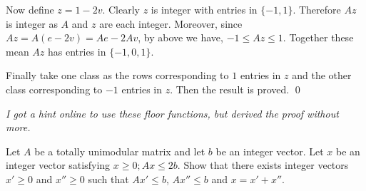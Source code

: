 \documentclass[10pt]{article}
\begin{document}
\begin{solution}
Now define \( z = 1-2v \). Clearly \( z \) is integer with entries in \( \{-1,1\} \). Therefore \( Az \) is integer as \( A \) and \( z \) are each integer. Moreover, since \( Az = A(e-2v) = Ae-2Av \), by above we have, \( -1\leq Az\leq 1 \). Together these mean \( Az \) has entries in \( \{-1,0,1\} \).

Finally take one class as the rows corresponding to \( 1 \) entries in \( z \) and the other class corresponding to \( -1 \) entries in \( z \). Then the result is proved. \qed

\textit{I got a hint online to use these floor functions, but derived the proof without more.}

\iffalse
Define a polyhedra,
\begin{align*}
    P = \left\{ x : \left[\begin{array}{r}A\\-A\\I\\-I\end{array}\right]x \leq \left[\begin{array}{r}1\\1\\1\\1\end{array}\right] \right\}
\end{align*}

Note that \( -1\leq x\leq 1 \) so that \( P \) is bounded. Moreover, and since \( 0\in P \), \( P \) is nonempty.

Therefore \( P \) has vertices, which are integer if \( A \) is totally unimodular.

We claim there is a vertex of \( P \) with no zero-entries.

Indeed, let \( v \) be a vertex of \( P \). Then for all \( i \), \( -1\leq v_i \leq 1\) and \( v_i\in \ZZ \) so \( v_i\in\{-1,0,1\} \). If \( v_i\in\{-1,1\} \) for all \( i \) we are done.

Suppose \( v_i = 0 \) for some \( i \).
\fi


\end{solution}

\begin{problem}[Problem 8.9]
Let \( A \) be a totally unimodular matrix and let \( b \) be an integer vector. Let \( x \) be an integer vector satisfying \( x\geq 0; Ax \leq 2b \). Show that there exists integer vectors \( x'\geq 0 \) and \( x''\geq 0 \) such that \( Ax'\leq b \), \( Ax''\leq b \) and \( x = x'+x'' \).
\end{problem}
\end{document}

